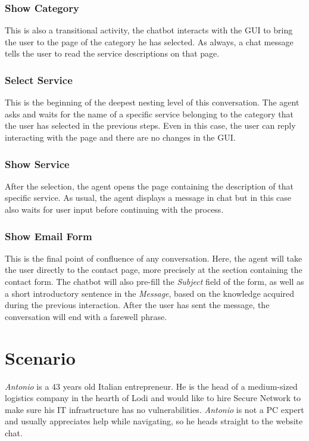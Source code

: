 \documentclass[12pt]{report}
\begin{document}
\subsection{Show Category}
This is also a transitional activity, the chatbot interacts with the GUI to 
bring the user to the page of the category he has selected.
As always, a chat message tells the user to read the service descriptions on 
that page.

\subsection{Select Service}
This is the beginning of the deepest nesting level of this conversation.
The agent asks and waits for the name of a specific service belonging to the 
category that the user has selected in the previous steps.
Even in this case, the user can reply interacting with the page and there are 
no changes in the GUI.

\subsection{Show Service}
After the selection, the agent opens the page containing the description of 
that specific service.
As usual, the agent displays a message in chat but in this case also waits 
for user input before continuing with the process.

\subsection{Show Email Form}
This is the final point of confluence of any conversation.
Here, the agent will take the user directly to the contact page, more
precisely at the section containing the contact form.
The chatbot will also pre-fill the \emph{Subject} field of the form,
as well as a short introductory sentence in the \emph{Message}, based
on the knowledge acquired during the previous interaction.
After the user has sent the message, the conversation will end with a 
farewell phrase.

\chapter{Scenario}
\emph{Antonio} is a 43 years old Italian entrepreneur. 
He is the head of a medium-sized logistics company in the hearth of Lodi and would like to hire Secure Network to make sure his IT infrastructure has no vulnerabilities.
\emph{Antonio} is not a PC expert and usually appreciates help while navigating, so he heads straight to the website chat.
\end{document}
